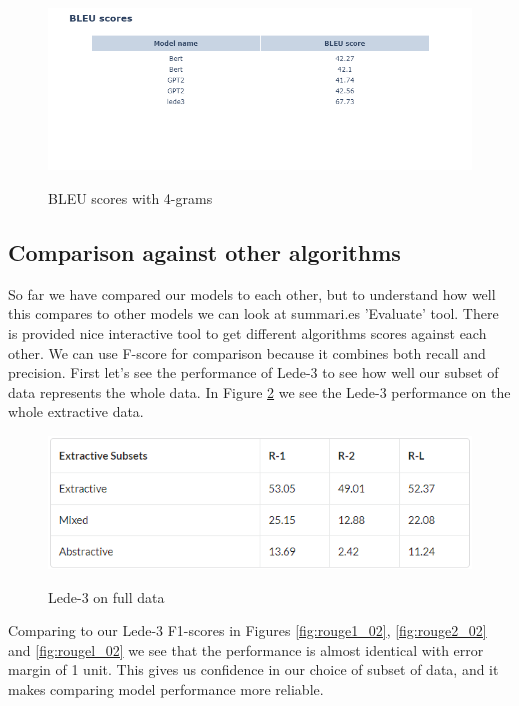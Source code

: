 \documentclass{article}
\begin{document}
\begin{figure}[H]
	\centering
	\hspace*{-2cm}
	\includegraphics[scale=0.55]{bleu_scores.png}\\
	\caption{BLEU scores with 4-grams}
	\label{fig:bleu}
\end{figure}


\subsection{Comparison against other algorithms}

So far we have compared our models to each other, but to understand how well this compares to other models we can look at summari.es 'Evaluate' tool. There is provided nice interactive tool to get different algorithms scores against each other. We can use F-score for comparison because it combines both recall and precision. First let's see the performance of Lede-3 to see how well our subset of data represents the whole data. In Figure \ref{fig:lede_full} we see the Lede-3 performance on the whole extractive data. 

\begin{figure}[H]
	\centering
	\includegraphics[scale=0.6]{lede3_full_data.png}\\
	\caption{Lede-3 on full data}
	\label{fig:lede_full}
\end{figure}

\noindent
Comparing to our Lede-3 F1-scores in Figures \ref{fig:rouge1_02}, \ref{fig:rouge2_02} and \ref{fig:rougel_02} we see that the performance is almost identical with error margin of 1 unit. This gives us confidence in our choice of subset of data, and it makes comparing model performance more reliable.\\
\end{document}
